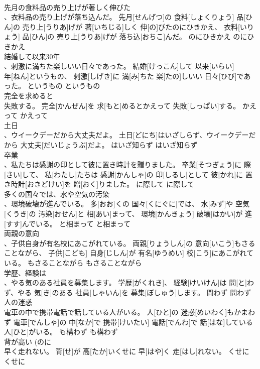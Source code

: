 \documentclass[8pt]{extreport}
\begin{document}
\begin{CJK}{UTF8}{min}
\\	先月の食料品の売り上げが著しく伸びた 
\\	、衣料品の売り上げが落ち込んだ。	先月[せんげつ]の 食料[しょくりょう] 品[ひん]の 売り上[うりあ]げが 著[いちじる]しく 伸[の]びたのにひきかえ、 衣料[いりょう] 品[ひん]の 売り上[うりあ]げが 落ち込[おちこ]んだ。	のにひきかえ	のにひきかえ	
\\	結婚して以来30年 
\\	、刺激に満ちた楽しいい日々であった。	結婚[けっこん]して 以来[いらい] 
\\	年[ねん]というもの、 刺激[しげき]に 満[み]ちた 楽[たの]しいい 日々[ひび]であった。	というもの	というもの	
\\	完全を求めると 
\\	失敗する。	完全[かんぜん]を 求[もと]めるとかえって 失敗[しっぱい]する。	かえって	かえって~	
\\	土日 
\\	、ウイークデーだから大丈夫だよ。	土日[どにち]はいざしらず、ウイークデーだから 大丈夫[だいじょうぶ]だよ。	はいざ知らず	はいざ知らず	
\\	卒業 
\\	、私たちは感謝の印として彼に置き時計を贈りました。	卒業[そつぎょう]に 際[さい]して、 私[わたし]たちは 感謝[かんしゃ]の 印[しるし]として 彼[かれ]に 置き時計[おきどけい]を 贈[おく]りました。	に際して	に際して	
\\	多くの国々では、水や空気の汚染 
\\	、環境破壊が進んでいる。	多[おお]くの 国々[くにぐに]では、 水[みず]や 空気[くうき]の 汚染[おせん]と 相[あい]まって、 環境[かんきょう] 破壊[はかい]が 進[すす]んでいる。	と相まって	と相まって	
\\	両親の意向 
\\	、子供自身が有名校にあこがれている。	両親[りょうしん]の 意向[いこう]もさることながら、 子供[こども] 自身[じしん]が 有名[ゆうめい] 校[こう]にあこがれている。	もさることながら	もさることながら	
\\	学歴、経験は 
\\	、やる気のある社員を募集します。	学歴[がくれき]、 経験[けいけん]は 問[と]わず、やる 気[き]のある 社員[しゃいん]を 募集[ぼしゅう]します。	問わず	問わず	
\\	人の迷惑 
\\	電車の中で携帯電話で話している人がいる。	人[ひと]の 迷惑[めいわく]もかまわず 電車[でんしゃ]の 中[なか]で 携帯[けいたい] 電話[でんわ]で 話[はな]している 人[ひと]がいる。	も構わず	も構わず	
\\	背が高い (のに 
\\	早く走れない。	背[せ]が 高[たか]いくせに 早[はや]く 走[はし]れない。	くせに	くせに	

\end{CJK}
\end{document}
